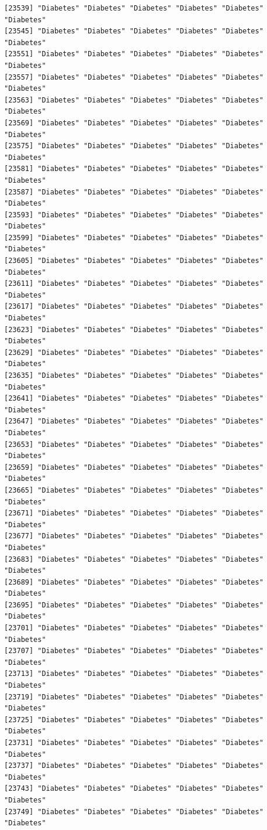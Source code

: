 \documentclass[
  letterpaper,
  DIV=11,
  numbers=noendperiod]{scrartcl}
\begin{document}
\begin{verbatim}
[23539] "Diabetes" "Diabetes" "Diabetes" "Diabetes" "Diabetes" "Diabetes"
[23545] "Diabetes" "Diabetes" "Diabetes" "Diabetes" "Diabetes" "Diabetes"
[23551] "Diabetes" "Diabetes" "Diabetes" "Diabetes" "Diabetes" "Diabetes"
[23557] "Diabetes" "Diabetes" "Diabetes" "Diabetes" "Diabetes" "Diabetes"
[23563] "Diabetes" "Diabetes" "Diabetes" "Diabetes" "Diabetes" "Diabetes"
[23569] "Diabetes" "Diabetes" "Diabetes" "Diabetes" "Diabetes" "Diabetes"
[23575] "Diabetes" "Diabetes" "Diabetes" "Diabetes" "Diabetes" "Diabetes"
[23581] "Diabetes" "Diabetes" "Diabetes" "Diabetes" "Diabetes" "Diabetes"
[23587] "Diabetes" "Diabetes" "Diabetes" "Diabetes" "Diabetes" "Diabetes"
[23593] "Diabetes" "Diabetes" "Diabetes" "Diabetes" "Diabetes" "Diabetes"
[23599] "Diabetes" "Diabetes" "Diabetes" "Diabetes" "Diabetes" "Diabetes"
[23605] "Diabetes" "Diabetes" "Diabetes" "Diabetes" "Diabetes" "Diabetes"
[23611] "Diabetes" "Diabetes" "Diabetes" "Diabetes" "Diabetes" "Diabetes"
[23617] "Diabetes" "Diabetes" "Diabetes" "Diabetes" "Diabetes" "Diabetes"
[23623] "Diabetes" "Diabetes" "Diabetes" "Diabetes" "Diabetes" "Diabetes"
[23629] "Diabetes" "Diabetes" "Diabetes" "Diabetes" "Diabetes" "Diabetes"
[23635] "Diabetes" "Diabetes" "Diabetes" "Diabetes" "Diabetes" "Diabetes"
[23641] "Diabetes" "Diabetes" "Diabetes" "Diabetes" "Diabetes" "Diabetes"
[23647] "Diabetes" "Diabetes" "Diabetes" "Diabetes" "Diabetes" "Diabetes"
[23653] "Diabetes" "Diabetes" "Diabetes" "Diabetes" "Diabetes" "Diabetes"
[23659] "Diabetes" "Diabetes" "Diabetes" "Diabetes" "Diabetes" "Diabetes"
[23665] "Diabetes" "Diabetes" "Diabetes" "Diabetes" "Diabetes" "Diabetes"
[23671] "Diabetes" "Diabetes" "Diabetes" "Diabetes" "Diabetes" "Diabetes"
[23677] "Diabetes" "Diabetes" "Diabetes" "Diabetes" "Diabetes" "Diabetes"
[23683] "Diabetes" "Diabetes" "Diabetes" "Diabetes" "Diabetes" "Diabetes"
[23689] "Diabetes" "Diabetes" "Diabetes" "Diabetes" "Diabetes" "Diabetes"
[23695] "Diabetes" "Diabetes" "Diabetes" "Diabetes" "Diabetes" "Diabetes"
[23701] "Diabetes" "Diabetes" "Diabetes" "Diabetes" "Diabetes" "Diabetes"
[23707] "Diabetes" "Diabetes" "Diabetes" "Diabetes" "Diabetes" "Diabetes"
[23713] "Diabetes" "Diabetes" "Diabetes" "Diabetes" "Diabetes" "Diabetes"
[23719] "Diabetes" "Diabetes" "Diabetes" "Diabetes" "Diabetes" "Diabetes"
[23725] "Diabetes" "Diabetes" "Diabetes" "Diabetes" "Diabetes" "Diabetes"
[23731] "Diabetes" "Diabetes" "Diabetes" "Diabetes" "Diabetes" "Diabetes"
[23737] "Diabetes" "Diabetes" "Diabetes" "Diabetes" "Diabetes" "Diabetes"
[23743] "Diabetes" "Diabetes" "Diabetes" "Diabetes" "Diabetes" "Diabetes"
[23749] "Diabetes" "Diabetes" "Diabetes" "Diabetes" "Diabetes" "Diabetes"

\end{verbatim}
\end{document}

